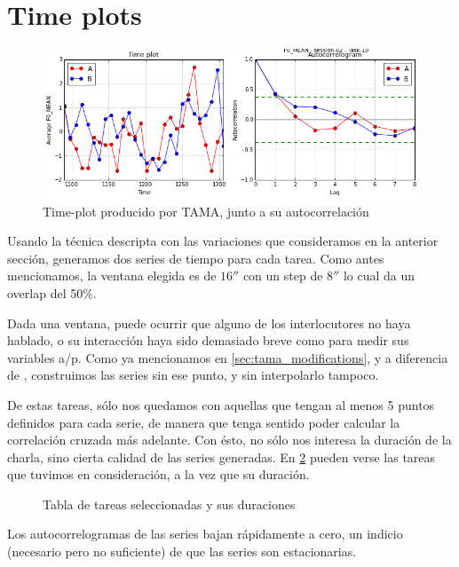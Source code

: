 \section{Time plots}

\begin{figure}
\centering
\includegraphics[width=15cm]{images/time_plot_with_autocorrelation.png}
\caption{Time-plot producido por TAMA, junto a su autocorrelación}
\label{fig:time_plot}
\end{figure}

Usando la técnica descripta con las variaciones que consideramos en la anterior sección, generamos dos series de tiempo para cada tarea. Como antes mencionamos, la ventana elegida es de $16''$ con un step de $8''$ lo cual da un overlap del 50\%.

Dada una ventana, puede ocurrir que alguno de los interlocutores no haya hablado, o su interacción haya sido demasiado breve como para medir sus variables a/p. Como ya mencionamos en \ref{sec:tama_modifications}, y a diferencia de \cite{KOU2008.2}, construimos las series sin ese punto, y sin interpolarlo tampoco.

De estas tareas, sólo nos quedamos con aquellas que tengan al menos 5 puntos definidos para cada serie, de manera que tenga sentido poder calcular la correlación cruzada más adelante. Con ésto, no sólo nos interesa la duración de la charla, sino cierta calidad de las series generadas. En \ref{time_series_table} pueden verse las tareas que tuvimos en consideración, a la vez que su duración.

\begin{figure}
\centering

\label{time_series_table}
\caption{Tabla de tareas seleccionadas y sus duraciones}
\end{figure}

Los autocorrelogramas de las series bajan rápidamente a cero, un indicio (necesario pero no suficiente) de que las series son estacionarias.


